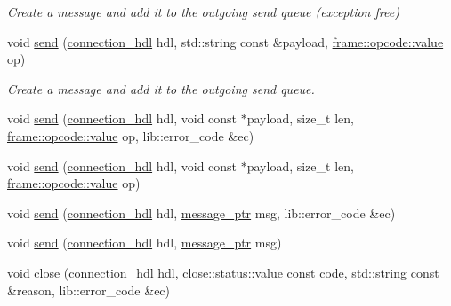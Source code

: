 \begin{DoxyCompactItemize}
\begin{DoxyCompactList}\small\item\em Create a message and add it to the outgoing send queue (exception free) \end{DoxyCompactList}\item 
void \hyperlink{classwebsocketpp_1_1endpoint_a9eb8f9fd7fbb7d8374eb02e100430bcf}{send} (\hyperlink{namespacewebsocketpp_a6b3d26a10ee7229b84b776786332631d}{connection\+\_\+hdl} hdl, std\+::string const \&payload, \hyperlink{namespacewebsocketpp_1_1frame_1_1opcode_ae68711643096dfc4af6d66ade3f9fd5e}{frame\+::opcode\+::value} op)
\begin{DoxyCompactList}\small\item\em Create a message and add it to the outgoing send queue. \end{DoxyCompactList}\item 
void \hyperlink{classwebsocketpp_1_1endpoint_a71e4454af8d8f133ca736e80c3adf268}{send} (\hyperlink{namespacewebsocketpp_a6b3d26a10ee7229b84b776786332631d}{connection\+\_\+hdl} hdl, void const $\ast$payload, size\+\_\+t len, \hyperlink{namespacewebsocketpp_1_1frame_1_1opcode_ae68711643096dfc4af6d66ade3f9fd5e}{frame\+::opcode\+::value} op, lib\+::error\+\_\+code \&ec)
\item 
void \hyperlink{classwebsocketpp_1_1endpoint_adc03a5bd5797a54fde64afd279032671}{send} (\hyperlink{namespacewebsocketpp_a6b3d26a10ee7229b84b776786332631d}{connection\+\_\+hdl} hdl, void const $\ast$payload, size\+\_\+t len, \hyperlink{namespacewebsocketpp_1_1frame_1_1opcode_ae68711643096dfc4af6d66ade3f9fd5e}{frame\+::opcode\+::value} op)
\item 
void \hyperlink{classwebsocketpp_1_1endpoint_a5cad5b7944435e7eec248e98e7e7a912}{send} (\hyperlink{namespacewebsocketpp_a6b3d26a10ee7229b84b776786332631d}{connection\+\_\+hdl} hdl, \hyperlink{classwebsocketpp_1_1endpoint_a585ecbbfd9689d4e4229e4c8378bd672}{message\+\_\+ptr} msg, lib\+::error\+\_\+code \&ec)
\item 
void \hyperlink{classwebsocketpp_1_1endpoint_a702e7d609babdacb8ae772b82c3fa8d0}{send} (\hyperlink{namespacewebsocketpp_a6b3d26a10ee7229b84b776786332631d}{connection\+\_\+hdl} hdl, \hyperlink{classwebsocketpp_1_1endpoint_a585ecbbfd9689d4e4229e4c8378bd672}{message\+\_\+ptr} msg)
\item 
void \hyperlink{classwebsocketpp_1_1endpoint_aa6b81c003dba27c6b30d62d5e79593a6}{close} (\hyperlink{namespacewebsocketpp_a6b3d26a10ee7229b84b776786332631d}{connection\+\_\+hdl} hdl, \hyperlink{namespacewebsocketpp_1_1close_1_1status_a8614a5c4733d708e2d2a32191c5bef84}{close\+::status\+::value} const code, std\+::string const \&reason, lib\+::error\+\_\+code \&ec)

\end{DoxyCompactItemize}
